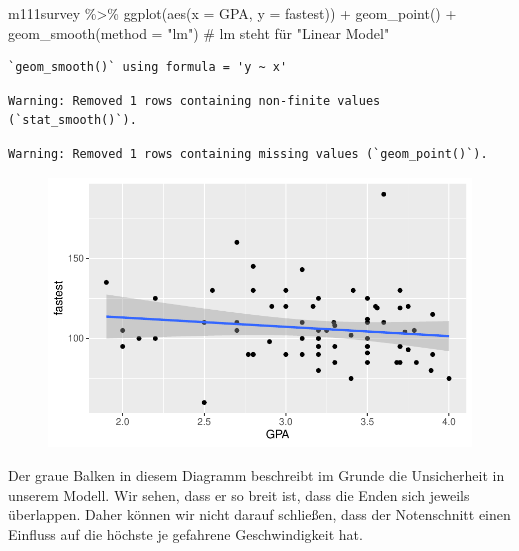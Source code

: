 \documentclass[
  letterpaper,
  DIV=11,
  numbers=noendperiod]{scrartcl}
\newenvironment{Shaded}{\begin{snugshade}}{\end{snugshade}}
\newcommand{\AttributeTok}[1]{\textcolor[rgb]{0.40,0.45,0.13}{#1}}
\newcommand{\CommentTok}[1]{\textcolor[rgb]{0.37,0.37,0.37}{#1}}
\newcommand{\FunctionTok}[1]{\textcolor[rgb]{0.28,0.35,0.67}{#1}}
\newcommand{\NormalTok}[1]{\textcolor[rgb]{0.00,0.23,0.31}{#1}}
\newcommand{\SpecialCharTok}[1]{\textcolor[rgb]{0.37,0.37,0.37}{#1}}
\newcommand{\StringTok}[1]{\textcolor[rgb]{0.13,0.47,0.30}{#1}}
\begin{document}
\begin{Shaded}
\begin{Highlighting}[]
\NormalTok{m111survey }\SpecialCharTok{\%\textgreater{}\%} 
  \FunctionTok{ggplot}\NormalTok{(}\FunctionTok{aes}\NormalTok{(}\AttributeTok{x =}\NormalTok{ GPA, }\AttributeTok{y =}\NormalTok{ fastest)) }\SpecialCharTok{+}
  \FunctionTok{geom\_point}\NormalTok{() }\SpecialCharTok{+}
  \FunctionTok{geom\_smooth}\NormalTok{(}\AttributeTok{method =} \StringTok{"lm"}\NormalTok{) }\CommentTok{\# lm steht für "Linear Model"}
\end{Highlighting}
\end{Shaded}

\begin{verbatim}
`geom_smooth()` using formula = 'y ~ x'
\end{verbatim}

\begin{verbatim}
Warning: Removed 1 rows containing non-finite values (`stat_smooth()`).
\end{verbatim}

\begin{verbatim}
Warning: Removed 1 rows containing missing values (`geom_point()`).
\end{verbatim}

\begin{figure}[H]

{\centering \includegraphics{05-visualisierung_files/figure-pdf/unnamed-chunk-5-1.pdf}

}

\end{figure}

Der graue Balken in diesem Diagramm beschreibt im Grunde die
Unsicherheit in unserem Modell. Wir sehen, dass er so breit ist, dass
die Enden sich jeweils überlappen. Daher können wir nicht darauf
schließen, dass der Notenschnitt einen Einfluss auf die höchste je
gefahrene Geschwindigkeit hat.
\end{document}
